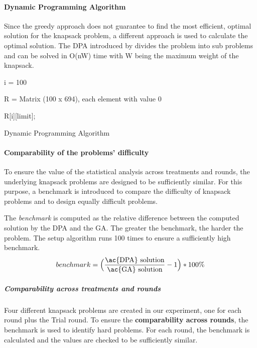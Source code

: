 \paragraph{Dynamic Programming Algorithm}
\label{par:DynamicProgrammingAlgorithm}
Since the greedy approach does not guarantee to find the most efficient, optimal solution for the knapsack problem, a different approach is used to calculate the optimal solution. The \ac{DPA} introduced by \cite{Kleinberg2005}  divides the problem into sub problems and can be solved in O(nW) time with W being the maximum weight of the knapsack.
\begin{algorithm} %
\LinesNumbered
\setcounter{AlgoLine}{0}
\SetNoFillComment
 \SetAlgoLined
 
i = 100\;

R = Matrix (100 x 694), each element with value 0\;

\Return R[i][limit]; 
\caption{Dynamic Programming Algorithm}
\end{algorithm}
\paragraph{Comparability of the problems' difficulty}
To ensure the value of the statistical analysis across treatments and rounds, the underlying knapsack problems are designed to be sufficiently similar. For this purpose, a benchmark is introduced to compare the difficulty of knapsack problems and to design equally difficult problems.

The \textit{benchmark} is computed as the relative difference between the computed solution by the \ac{DPA} and the \ac{GA}. The greater the benchmark, the harder the problem.
The setup algorithm runs 100 times to ensure a sufficiently high benchmark.
\begin{equation}
benchmark = \Big(\dfrac{\text{\ac{DPA} solution}}{\text{\ac{GA} solution}} -1\Big) * 100\%
\end{equation}

\subparagraph{Comparability across treatments and rounds}
Four different knapsack problems are created in our experiment, one for each round plus the Trial round. To ensure the \textbf{comparability across rounds}, the benchmark is used to identify hard problems. For each round, the benchmark is calculated and the values are checked to be sufficiently similar.
 
